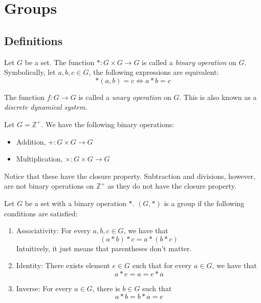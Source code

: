 \chapter{Groups}

\section{Definitions}

\begin{definition}
    Let \(G\) be a set. The function \(*: G \times G \to G\) is called a \textit{binary operation} on \(G\). Symbolically, let \(a, b, c \in G\), the following expressions are equivalent:
    \[
        *(a, b) = c \iff a * b = c
    \]
\end{definition}

\begin{remark}
    The function \(f: G \to G\) is called a \textit{unary operation} on \(G\). This is also known as a \textit{discrete dynamical system}.
\end{remark}

\begin{nexample}
    Let \(G = \mathbb{Z}^+\). We have the following binary operations:
    \begin{itemize}
        \item Addition, \(+: G \times G \to G\)
        \item Multiplication, \(\times: G \times G \to G\)
    \end{itemize}
    Notice that these have the closure property. Subtraction and divisions, however, are not binary operations on \(\mathbb{Z}^+\) as they do not have the closure property.
\end{nexample}

\begin{definition}[Group]
    Let \(G\) be a set with a binary operation \(*\). \((G, *)\) is a group if the following conditions are satisfied:
    \begin{enumerate}
        \item Associativity: For every \(a, b, c \in G\), we have that
            \[
                (a * b) * c = a * (b * c)
            \]
            Intuitively, it just means that parentheses don't matter.
        \item Identity: There exists element \(e \in G\) such that for every \(a \in G\), we have that
            \[
                a * e = a = e * a
            \]
        \item Inverse: For every \(a \in G\), there is \(b \in G\) such that
            \[
                a * b = b * a = e
            \]
    \end{enumerate}
\end{definition}

